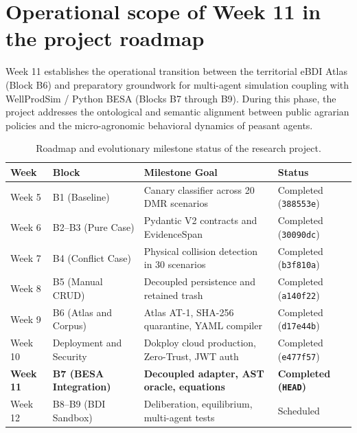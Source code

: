 \documentclass[11pt,a4paper]{article}
\begin{document}
\section{Operational scope of Week 11 in the project roadmap}

Week 11 establishes the operational transition between the territorial eBDI Atlas (Block B6) and preparatory groundwork for multi-agent simulation coupling with WellProdSim / Python BESA (Blocks B7 through B9). During this phase, the project addresses the ontological and semantic alignment between public agrarian policies and the micro-agronomic behavioral dynamics of peasant agents.

\begin{table}[H]
\centering
\small
\caption{Roadmap and evolutionary milestone status of the research project.}
\label{tab:roadmap}
\begin{tabularx}{\textwidth}{lp{3.2cm}p{5.2cm}X}
\toprule
\textbf{Week} & \textbf{Block} & \textbf{Milestone Goal} & \textbf{Status} \\
\midrule
Week 5 & B1 (Baseline) & Canary classifier across 20 DMR scenarios & Completed (\texttt{388553e}) \\
Week 6 & B2--B3 (Pure Case) & Pydantic V2 contracts and EvidenceSpan & Completed (\texttt{30090dc}) \\
Week 7 & B4 (Conflict Case) & Physical collision detection in 30 scenarios & Completed (\texttt{b3f810a}) \\
Week 8 & B5 (Manual CRUD) & Decoupled persistence and retained trash & Completed (\texttt{a140f22}) \\
Week 9 & B6 (Atlas and Corpus) & Atlas AT-1, SHA-256 quarantine, YAML compiler & Completed (\texttt{d17e44b}) \\
Week 10 & Deployment and Security & Dokploy cloud production, Zero-Trust, JWT auth & Completed (\texttt{e477f57}) \\
\textbf{Week 11} & \textbf{B7 (BESA Integration)} & \textbf{Decoupled adapter, AST oracle, equations} & \textbf{Completed (\texttt{HEAD})} \\
Week 12 & B8--B9 (BDI Sandbox) & Deliberation, equilibrium, multi-agent tests & Scheduled \\
\bottomrule
\end{tabularx}
\end{table}

\end{document}

